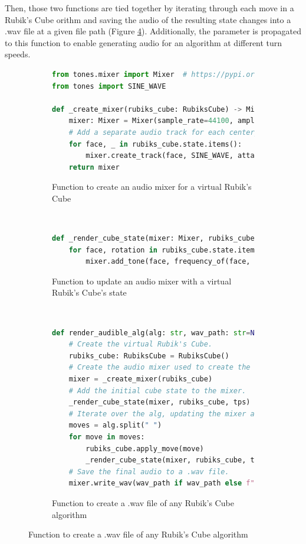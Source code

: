 Then, those two functions are tied together by iterating through each
move in a Rubik's Cube orithm and saving the audio of the
resulting state changes into a .wav file at a given file path (Figure
\ref{fig:code-render-audible-alg}). Additionally, the 
parameter is propagated to this function to enable generating audio for
an algorithm at different turn speeds.

\begin{figure}[h]
\caption{Generating audio for any Rubik's Cube algorithm}
\label{fig:code-generate-alg-audio}
\begin{subfigure}{\textwidth}
\caption{Function to create an audio mixer for a virtual Rubik's Cube}
\label{fig:code-create-mixer}
\begin{lstlisting}[language=Python]
from tones.mixer import Mixer  # https://pypi.org/project/tones/
from tones import SINE_WAVE

def _create_mixer(rubiks_cube: RubiksCube) -> Mixer:
    mixer: Mixer = Mixer(sample_rate=44100, amplitude=1)
    # Add a separate audio track for each centerpiece.
    for face, _ in rubiks_cube.state.items():
        mixer.create_track(face, SINE_WAVE, attack=0, decay=0)
    return mixer
\end{lstlisting}
\vspace*{2mm}
\end{subfigure}\\
\begin{subfigure}{\textwidth}
\caption{Function to update an audio mixer with a virtual Rubik's Cube's state}
\label{fig:code-render-cube-state}
\begin{lstlisting}[language=Python, firstnumber=last]
def _render_cube_state(mixer: Mixer, rubiks_cube: RubiksCube, tps: float):
    for face, rotation in rubiks_cube.state.items():
        mixer.add_tone(face, frequency_of(face, rotation), duration=1 / tps)
\end{lstlisting}
\vspace*{2mm}
\end{subfigure}\\
\begin{subfigure}{\textwidth}
\caption{Function to create a .wav file of any Rubik's Cube algorithm}
\label{fig:code-render-audible-alg}
\begin{lstlisting}[language=Python, firstnumber=last]
def render_audible_alg(alg: str, wav_path: str=None, tps: float=4):
    # Create the virtual Rubik's Cube.
    rubiks_cube: RubiksCube = RubiksCube()
    # Create the audio mixer used to create the synthesized audio.
    mixer = _create_mixer(rubiks_cube)
    # Add the initial cube state to the mixer.
    _render_cube_state(mixer, rubiks_cube, tps)
    # Iterate over the alg, updating the mixer after each move.
    moves = alg.split(" ")
    for move in moves:
        rubiks_cube.apply_move(move)
        _render_cube_state(mixer, rubiks_cube, tps)
    # Save the final audio to a .wav file.
    mixer.write_wav(wav_path if wav_path else f"{alg}.wav")
\end{lstlisting}
\end{subfigure}
\end{figure}

